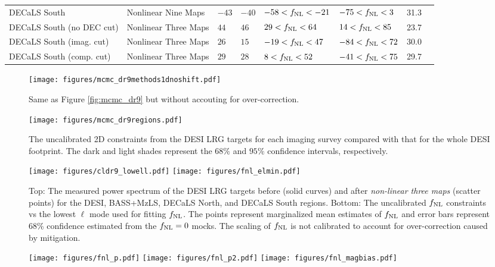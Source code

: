 \begin{table*}
{\begin{tabular}{llllllll}
DECaLS South              & Nonlinear Nine Maps& $   -43$& $   -40$& $   -58<f_{\rm NL}<   -21$& $   -75<f_{\rm NL}<     3$ &   31.3\\
DECaLS South (no DEC cut) & Nonlinear Three Maps& $    44$& $    46$& $    29<f_{\rm NL}<    64$& $    14<f_{\rm NL}<    85$ &   23.7\\
DECaLS South (imag. cut)  & Nonlinear Three Maps& $    26$& $    15$& $   -19<f_{\rm NL}<    47$& $   -84<f_{\rm NL}<    72$ &   30.0\\
DECaLS South (comp. cut)  & Nonlinear Three Maps& $    29$& $    28$& $     8<f_{\rm NL}<    52$& $   -41<f_{\rm NL}<    75$ &   29.7\\
   \hline
    \end{tabular}}
\end{table*}





\begin{figure}
    \centering
    \texttt{[image: figures/mcmc\_dr9methods1dnoshift.pdf]}
    \caption{Same as Figure \ref{fig:mcmc_dr9} but without accouting for over-correction. }
    \label{fig:mcmcdr9noshift}
\end{figure}
\begin{figure}
    \centering
    \texttt{[image: figures/mcmc\_dr9regions.pdf]} 
    \caption{The uncalibrated 2D constraints from the DESI LRG targets for each imaging survey compared with that for the whole DESI footprint. The dark and light shades represent the $68\%$ and $95\%$ confidence intervals, respectively.}\label{fig:mcmc_dr9reg}
\end{figure}
\begin{figure*}
    \centering
    \texttt{[image: figures/cldr9\_lowell.pdf]}
    \texttt{[image: figures/fnl\_elmin.pdf]}  
    \caption{Top: The measured power spectrum of the DESI LRG targets before (solid curves) and after \textit{non-linear three maps} (scatter points) for the DESI, BASS+MzLS, DECaLS North, and DECaLS South regions. Bottom: The uncalibrated $f_{\rm NL}$ constraints vs the lowest $\ell$ mode used for fitting $f_{\rm NL}$. The points represent marginalized mean estimates of $f_{\rm NL}$ and error bars represent $68$\% confidence estimated from the $f_{\rm NL}=0$ mocks. The scaling of $f_{\rm NL}$ is not calibrated to account for over-correction caused by mitigation.}\label{fig:mcmc_dr9elmin}
\end{figure*}

\begin{figure}
\texttt{[image: figures/fnl\_p.pdf]}
\texttt{[image: figures/fnl\_p2.pdf]}
\texttt{[image: figures/fnl\_magbias.pdf]}
\caption{}\label{fig:fnl_magbias}
\end{figure}